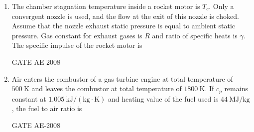 \documentclass[journal,12pt,onecolumn]{IEEEtran}
\theoremstyle{remark}
\begin{document}
\begin{enumerate}
\item The chamber stagnation temperature inside a rocket motor is $T_c$. Only a convergent nozzle is used, and the flow at the exit of this nozzle is choked. Assume that the nozzle exhaust static pressure is equal to ambient static pressure. Gas constant for exhaust gases is $R$ and ratio of specific heats is $\gamma$. The specific impulse of the rocket motor is  \\
\begin{enumerate}
\end{enumerate}
\hfill{GATE AE-2008}

    \quad

\item  Air enters the combustor of a gas turbine engine at total temperature of $500 \ \mathrm{K}$ and leaves the combustor at total temperature of $1800 \ \mathrm{K}$. If $c_p$ remains constant at $1.005 \ \mathrm{kJ/(kg \cdot K)}$ and heating value of the fuel used is $44 \ \mathrm{MJ/kg}$, the fuel to air ratio is  \\
\begin{enumerate}
\end{enumerate}
\hfill{GATE AE-2008}

    \quad


\end{enumerate}
\end{document}
